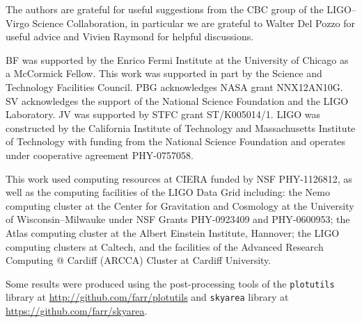 \acknowledgements

The authors are grateful for useful suggestions from the CBC group of the LIGO--Virgo Science Collaboration, in particular we are grateful to Walter Del Pozzo for useful advice and Vivien Raymond for helpful discussions.

BF was supported by the Enrico Fermi Institute at the University of Chicago as a McCormick Fellow.  This work was supported in part by the Science and Technology Facilities Council. PBG acknowledges NASA grant NNX12AN10G. SV acknowledges the support of the National Science Foundation and the LIGO Laboratory. JV was supported by STFC grant ST/K005014/1. LIGO was constructed by the California Institute of Technology and Massachusetts Institute of Technology with funding from the National Science Foundation and operates under cooperative agreement PHY-0757058.

This work used computing resources at CIERA funded by NSF PHY-1126812, as well as the computing facilities of the LIGO Data Grid including: the Nemo computing cluster at the Center for Gravitation and Cosmology at the University of Wisconsin--Milwauke under NSF Grants PHY-0923409 and PHY-0600953; the Atlas computing cluster at the Albert Einstein Institute, Hannover; the LIGO computing clusters at Caltech, and the facilities of the Advanced Research Computing @ Cardiff (ARCCA) Cluster at Cardiff University.

Some results were produced using the post-processing tools of the \texttt{plotutils} library at \url{http://github.com/farr/plotutils} and \texttt{skyarea} library at \url{https://github.com/farr/skyarea}.
  
  
  
  
  